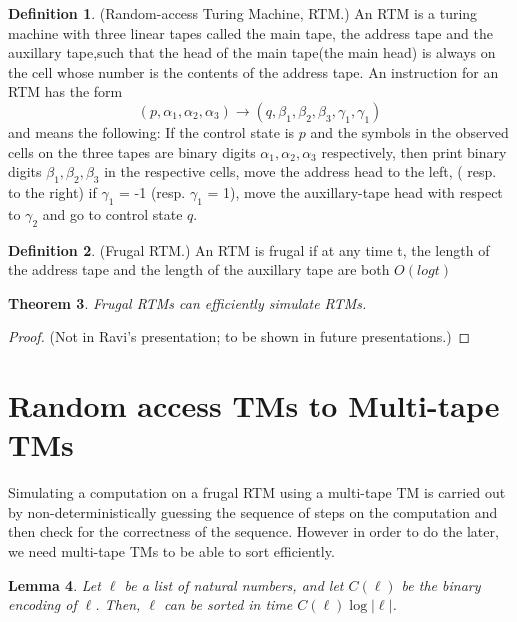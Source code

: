 \documentclass[english]{article}
\theoremstyle{plain}
\newtheorem{thm}{Theorem}
\theoremstyle{definition}
\newtheorem{defn}[thm]{Definition}
\theoremstyle{plain}
\newtheorem{lem}[thm]{Lemma}
\begin{document}
\begin{defn}
(Random-access Turing Machine, RTM.) An RTM is a turing machine with three linear tapes called the main tape, the address tape and the auxillary tape,such that the head of the main tape(the main head) is always on the cell whose number is the contents of the address tape. An instruction for an RTM has the form
\begin{equation}
(p,\alpha_1,\alpha_2,\alpha_3) \rightarrow (q,\beta_1,\beta_2,\beta_3,\gamma_1,\gamma_1)
\end{equation}
and means the following: If the control state is $p$ and the symbols in the observed cells on the three tapes are binary digits $\alpha_1,\alpha_2,\alpha_3$ respectively, then print binary digits $ \beta_1,\beta_2,\beta_3$ in the respective cells, move the address head to the left, ( resp. to the right) if $\gamma_1$ = -1 (resp. $\gamma_1$ = 1), move the auxillary-tape head with respect to $\gamma_2$ and go to control state $q$.

\end{defn}

\begin{defn}
(Frugal RTM.) An RTM is frugal if at any time t, the length of the address tape and the length of the auxillary tape are both $O(log t)$
\end{defn}

\begin{thm}
Frugal RTMs can efficiently simulate RTMs.
\end{thm}

\begin{proof}
(Not in Ravi's presentation; to be shown in future presentations.)
\end{proof}

\section{Random access TMs to Multi-tape TMs}

Simulating a computation on a frugal RTM using a multi-tape TM is carried out by non-deterministically guessing the sequence of steps on the computation and then check for the correctness of the sequence. However in order to do the later, we need multi-tape TMs to be able to sort efficiently.

\begin{lem}
Let $\ell$ be a list of natural numbers, and let $C(\ell)$ be the
binary encoding of $\ell$. Then, $\ell$ can be sorted in time $C(\ell)\log|\ell|$.
\end{lem}
\end{document}
